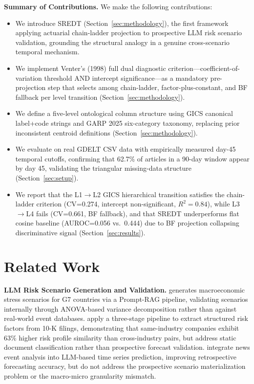 \documentclass[11pt,letterpaper]{article}
\begin{document}
\textbf{Summary of Contributions.} We make the following contributions:
\begin{itemize}
  \item We introduce SREDT (Section~\ref{sec:methodology}), the first framework applying actuarial chain-ladder projection to prospective LLM risk scenario validation, grounding the structural analogy in a genuine cross-scenario temporal mechanism.
  \item We implement Venter's (1998) full dual diagnostic criterion---coefficient-of-variation threshold AND intercept significance---as a mandatory pre-projection step that selects among chain-ladder, factor-plus-constant, and BF fallback per level transition (Section~\ref{sec:methodology}).
  \item We define a five-level ontological column structure using GICS canonical label+code strings and GARP 2025 six-category taxonomy, replacing prior inconsistent centroid definitions (Section~\ref{sec:methodology}).
  \item We evaluate on real GDELT CSV data with empirically measured day-45 temporal cutoffs, confirming that 62.7\% of articles in a 90-day window appear by day 45, validating the triangular missing-data structure (Section~\ref{sec:setup}).
  \item We report that the L1$\to$L2 GICS hierarchical transition satisfies the chain-ladder criterion (CV=0.274, intercept non-significant, $R^2=0.84$), while L3$\to$L4 fails (CV=0.661, BF fallback), and that SREDT underperforms flat cosine baseline (AUROC=0.056 vs.~0.444) due to BF projection collapsing discriminative signal (Section~\ref{sec:results}).
\end{itemize}

\section{Related Work}

\textbf{LLM Risk Scenario Generation and Validation.} \citet{Soleimani2025} generates macroeconomic stress scenarios for G7 countries via a Prompt-RAG pipeline, validating scenarios internally through ANOVA-based variance decomposition rather than against real-world event databases. \citet{Dolphin2026} apply a three-stage pipeline to extract structured risk factors from 10-K filings, demonstrating that same-industry companies exhibit 63\% higher risk profile similarity than cross-industry pairs, but address static document classification rather than prospective forecast validation. \citet{Wang2024} integrate news event analysis into LLM-based time series prediction, improving retrospective forecasting accuracy, but do not address the prospective scenario materialization problem or the macro-micro granularity mismatch.
\end{document}
